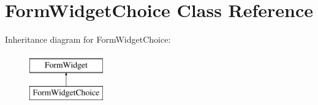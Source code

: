 \hypertarget{class_form_widget_choice}{}\section{Form\+Widget\+Choice Class Reference}
\label{class_form_widget_choice}
Inheritance diagram for Form\+Widget\+Choice\+:\begin{figure}[H]
\begin{center}
\leavevmode
\includegraphics[height=2.000000cm]{class_form_widget_choice}
\end{center}
\end{figure}
